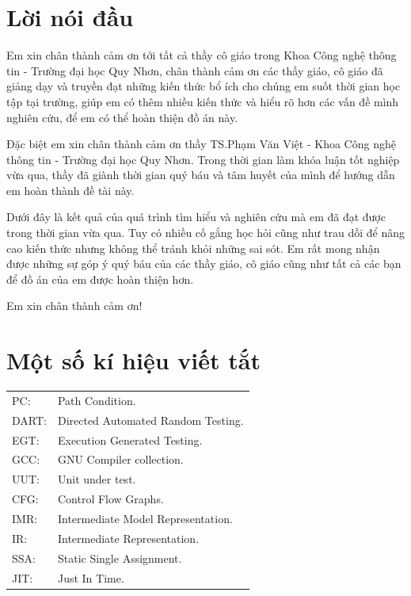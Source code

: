 \documentclass[12pt,a4paper]{report}
\begin{document}
\chapter*{Lời nói đầu}

Em xin chân thành cảm ơn tới tất cả thầy cô giáo trong Khoa Công nghệ thông tin - Trường đại học Quy Nhơn, chân thành cảm ơn các thầy giáo, cô giáo đã giảng dạy và truyền đạt những kiến thức bổ ích cho chúng em suốt thời gian học tập tại trường, giúp em có thêm nhiều kiến thức và hiểu rõ hơn các vấn đề mình nghiên cứu, để em có thể hoàn thiện đồ án này.

Đặc biệt em xin chân thành cảm ơn thầy TS.Phạm Văn Việt - Khoa Công nghệ thông tin - Trường đại học Quy Nhơn. Trong thời gian làm khóa luận tốt nghiệp vừa qua, thầy đã giành thời gian quý báu và tâm huyết của mình để hướng dẫn em hoàn thành đề tài này.

Dưới đây là kết quả của quá trình tìm hiểu và nghiên cứu mà em đã đạt được trong thời gian vừa qua. Tuy có nhiều cố gắng học hỏi cũng như trau dồi để nâng cao kiến thức nhưng không thể tránh khỏi những sai sót. Em rất mong nhận được những sự góp ý quý báu của các thầy giáo, cô giáo cũng như tất cả các bạn để đồ án của em được hoàn thiện hơn.

Em xin chân thành cảm ơn!

\tableofcontents {}  \newpage

\chapter*{Một số kí hiệu viết tắt}


\begin{tabular}{l l }

PC: & Path Condition.\\

DART: & Directed Automated Random Testing.\\

EGT: & Execution Generated Testing.\\

GCC: & GNU Compiler collection.\\

UUT: & Unit under test.\\

CFG: & Control Flow Graphs.\\

IMR: & Intermediate Model Representation.\\

IR: & Intermediate Representation.\\

SSA: & Static Single Assignment.\\

JIT: & Just In Time.\\

\end{tabular}
\end{document}
